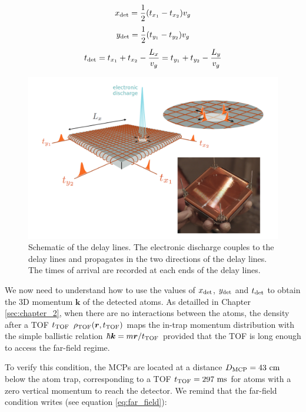 \begin{equation}
    x_{\rm{det}}=\frac{1}{2} (t_{x_1}-t_{x_2})v_g
\end{equation}
\begin{equation}
    y_{\rm{det}}=\frac{1}{2} (t_{y_1}-t_{y_2})v_g
\end{equation}
\begin{equation}
    t_{\rm{det}}=t_{x_{1}}+t_{x_{2}}-\frac{L_{x}}{v_{g}}=t_{y_{1}}+t_{y_{2}}-\frac{L_{y}}{v_{g}}
    \label{eq:tdet_MCP}
\end{equation}

\begin{figure}[ht!]
    \centering
    \includegraphics[width=\textwidth]{Fig/Chapter3/delay_lines.png}
    \caption[Schematic of the delay lines]{Schematic of the delay lines. The electronic discharge couples to the delay lines and propagates in the two directions of the delay lines. The times of arrival are recorded at each ends of the delay lines.}
    \label{fig:delay_lines}
\end{figure}

We now need to understand how to use the values of $x_{\rm{det}}$, $y_{\rm{det}}$ and $t_{\rm{det}}$ to obtain the 3D momentum $\bm{k}$ of the detected atoms. As detailled in Chapter \ref{sec:chapter_2}, when there are no interactions between the atoms, the density after a TOF $t_{\rm{TOF}}$ $\rho_{\rm{TOF}} (\bm{r},t_{\rm{TOF}})$ maps the in-trap momentum distribution with the simple ballistic relation $\hbar \bm{k} = m \bm{r}/t_{\rm{TOF}}$ provided that the TOF is long enough to access the far-field regime. 

To verify this condition, the MCPs are located at a distance $D_{\rm{MCP}}=43 \ \rm{cm}$ below the atom trap, corresponding to a TOF $t_{\rm{TOF}}=297 \ \rm{ms}$ for atoms with a zero vertical momentum to reach the detector. We remind that the far-field condition writes (see equation \ref{eq:far_field}):

